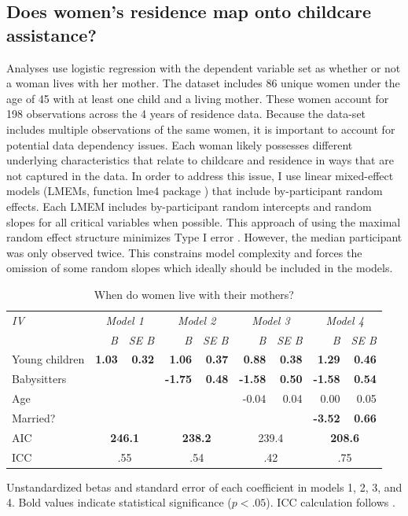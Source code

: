 \documentclass[10pt]{article}
\begin{document}
\subsection{Does women's residence map onto childcare assistance?}  
Analyses use logistic regression with the dependent variable set as whether or not a woman lives with her mother.  The dataset includes 86 unique women under the age of 45 with at least one child and a living mother.  These women account for 198 observations across the 4 years of residence data.  Because the data-set includes multiple observations of the same women, it is important to account for potential data dependency issues.  Each woman likely possesses different underlying characteristics that relate to childcare and residence in ways that are not captured in the data.  In order to address this issue, I use linear mixed-effect models (LMEMs, function lme4 package \citep{bates2011lmer}) that include by-participant random effects.  Each LMEM includes by-participant random intercepts and random slopes for all critical variables when possible.  This approach of using the maximal random effect structure minimizes Type \textrm{I} error \citep{barr2013random, schielzeth2009conclusions}.  However, the median participant was only observed twice.  This constrains model complexity and forces the omission of some random slopes which ideally should be included in the models. 

\begin{table}[!tb]
\caption {When do women live with their mothers? \label{tab:bbsit} }
  \centering
  \begin{tabular}{| l | r r | r r | r r | r r |} 
  	\hline
	\emph{IV} & \multicolumn{2}{|c|}{\emph{Model 1}} & \multicolumn{2}{|c|}{\emph{Model 2}} & \multicolumn{2}{|c|}{\emph{Model 3}} & \multicolumn{2}{|c|}{\emph{Model 4}}\\ 
	& \emph{B} & \emph{SE B} & \emph{B} & \emph{SE B} & \emph{B} & \emph{SE B} & \emph{B} & \emph{SE B}\\ \hline
	Young children & \textbf{1.03} & \textbf{0.32} & \textbf{1.06} & \textbf{0.37} & \textbf{0.88} & \textbf{0.38} & \textbf{1.29} & \textbf{0.46} \\	
	Babysitters &  &  & \textbf{-1.75} & \textbf{0.48} & \textbf{-1.58} & \textbf{0.50} & \textbf{-1.58} & \textbf{0.54} \\
	Age & & & & & -0.04 & 0.04 & 0.00 & 0.05 \\
	Married? & & & & & & & \textbf{-3.52} & \textbf{0.66} \\
	AIC & \multicolumn{2}{|c|}{\textbf{246.1}} & \multicolumn{2}{|c|}{\textbf{238.2}} & \multicolumn{2}{|c|}{239.4} & \multicolumn{2}{|c|}{\textbf{208.6}}\\ 
	ICC & \multicolumn{2}{|c|}{.55} & \multicolumn{2}{|c|}{.54} & \multicolumn{2}{|c|}{.42} & \multicolumn{2}{|c|}{.75}\\ \hline
  \end{tabular}  
{Unstandardized betas and standard error of each coefficient in models 1, 2, 3, and 4.  Bold values indicate statistical significance ($p < .05$).  ICC calculation follows \citep{zeger1988models}.}
\end{table}
\end{document}
